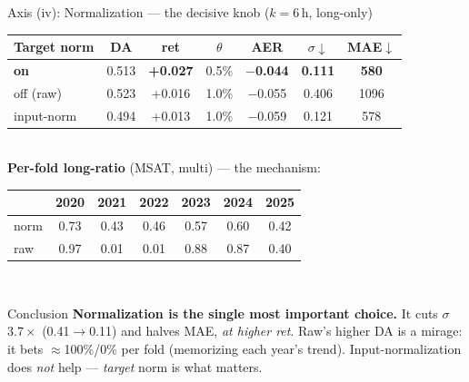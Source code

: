 \documentclass[10pt,aspectratio=169]{beamer}
\newcommand{\gd}[1]{\textbf{\textcolor{good}{#1}}}
\newcommand{\bd}[1]{\textcolor{bad}{#1}}
\begin{document}
\begin{frame}{Axis (iv): Normalization --- the decisive knob \hfill\normalfont\small($k{=}6$\,h, long-only)}
\centering\small
\setlength{\tabcolsep}{6pt}
\begin{tabular}{@{}l cc c c cc@{}}
\toprule
Target norm & DA & ret & $\theta$ & AER & $\sigma\!\downarrow$ & MAE$\downarrow$ \\ \midrule
\gd{on}       & 0.513 & \gd{+0.027} & 0.5\% & \gd{$-$0.044} & \gd{0.111} & \gd{580} \\
off (raw)     & 0.523 & +0.016 & 1.0\% & $-$0.055 & \bd{0.406} & \bd{1096} \\
input-norm    & 0.494 & +0.013 & 1.0\% & $-$0.059 & 0.121 & 578 \\
\bottomrule
\end{tabular}
\\[0.6em]
\textbf{Per-fold long-ratio} (MSAT, multi) --- the mechanism:
\\[0.2em]
\setlength{\tabcolsep}{6pt}
\begin{tabular}{@{}l cccccc@{}}
\toprule
 & 2020 & 2021 & 2022 & 2023 & 2024 & 2025 \\ \midrule
norm & 0.73 & 0.43 & 0.46 & 0.57 & 0.60 & 0.42 \\
raw  & 0.97 & \bd{0.01} & \bd{0.01} & 0.88 & 0.87 & 0.40 \\
\bottomrule
\end{tabular}
\\[0.6em]
\begin{block}{Conclusion}
\footnotesize
\textbf{Normalization is the single most important choice.} It cuts $\sigma$ \gd{$3.7\times$}
(0.41$\to$0.11) and halves MAE, \emph{at higher ret}. Raw's higher DA is a \bd{mirage}: it bets
$\approx$100\%/0\% per fold (memorizing each year's trend). Input-normalization does \emph{not}
help --- \emph{target} norm is what matters.
\end{block}
\end{frame}
\end{document}
